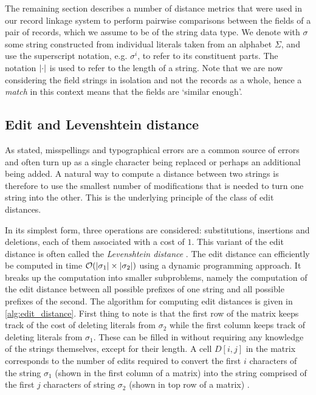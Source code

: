 The remaining section describes a number of distance metrics that were used in our record linkage system to perform pairwise comparisons between the fields of a pair of records, which we assume to be of the string data type.
We denote with $\sigma$ some string constructed from individual literals taken from an alphabet $\Sigma$, and use the superscript notation, e.g. $\sigma^{i}$, to refer to its constituent parts.
The notation $\lvert\cdot\rvert$ is used to refer to the length of a string.
Note that we are now considering the field strings in isolation and not the records as a whole, hence a \emph{match} in this context means that the fields are `similar enough'.




\subsection{Edit and Levenshtein distance}
\label{sec:edit_distance}

As stated, misspellings and typographical errors are a common source of errors and often turn up as a single character being replaced or perhaps an additional being added.
A natural way to compute a distance between two strings is therefore to use the smallest number of modifications that is needed to turn one string into the other.
This is the underlying principle of the class of edit distances.

In its simplest form, three operations are considered: substitutions, insertions and deletions, each of them associated with a cost of $1$.
This variant of the edit distance is often called the \emph{Levenshtein distance} \citep{Levenshtein1966}.
The edit distance can efficiently be computed in time $\mathcal{O}(\lvert\sigma_1\rvert \times \lvert\sigma_2\rvert)$ using a dynamic programming approach.
It breaks up the computation into smaller subproblems, namely the computation of the edit distance between all possible prefixes of one string and all possible prefixes of the second.
The algorithm for computing edit distances is given in \cref{alg:edit_distance}.
First thing to note is that the first row of the matrix keeps track of the cost of deleting literals from $\sigma_{2}$ while the first column keeps track of deleting literals from $\sigma_{1}$.
These can be filled in without requiring any knowledge of the strings themselves, except for their length.
A cell $D[i,j]$ in the matrix corresponds to the number of edits required to convert the first $i$ characters of the string $\sigma_1$ (shown in the first column of a matrix) into the string comprised of the first $j$ characters of string $\sigma_2$ (shown in top row of a matrix) \citep{Christen2012}.

